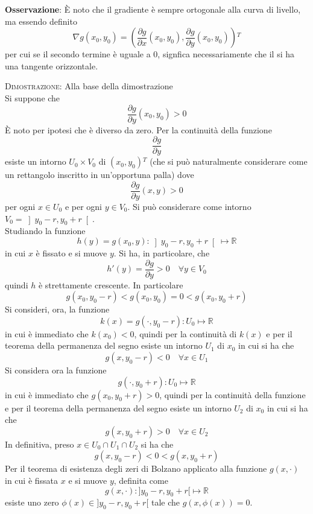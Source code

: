 \documentclass[a4paper]{extarticle}
\begin{document}
\vspace{2em}
\noindent
\textbf{Osservazione}: È noto che il gradiente è sempre ortogonale alla curva di livello, ma essendo definito
\[\nabla g(x_0,y_0) = \left(\dfrac{\partial g}{\partial x}(x_0,y_0), \dfrac{\partial g}{\partial y} (x_0,y_0)\right){^T}\]
per cui se il secondo termine è uguale a $0$, signfica necessariamente che il si ha una tangente orizzontale.

\vspace{2em}
\noindent
\normalfont \normalsize
\textsc{Dimostrazione}: Alla base della dimostrazione\\
Si suppone che
\[\dfrac{\partial g}{\partial y}(x_0,y_0) > 0\]
È noto per ipotesi che è diverso da zero. Per la continuità della funzione
\[\dfrac{\partial g}{\partial y}\]
esiste un intorno $U_0 \times V_0$ di $(x_0,y_0){^T}$ (che si può naturalmente considerare come un rettangolo inscritto in un'opportuna palla) dove
\[\dfrac{\partial g}{\partial y}(x,y) > 0\]
per ogni $x \in U_0$ e per ogni $y \in V_0$. Si può considerare come intorno $V_0 = \left]y_0-r,y_0+r\right[$.\\
Studiando la funzione
\[h(y) = g(x_0,y) : \left]y_0-r,y_0+r\right[ \longmapsto \mathbb{R}\]
in cui $x$ è fissato e si muove $y$. Si ha, in particolare, che
\[h'(y) = \dfrac{\partial g}{\partial y} > 0 \hspace{1em} \forall y \in V_0\]
quindi $h$ è strettamente crescente. In particolare
\[g(x_0,y_0-r) < g(x_0,y_0) = 0 < g(x_0,y_0+r)\]
Si consideri, ora, la funzione
\[k(x) = g(\cdot,y_0-r) : U_0 \longmapsto \mathbb{R}\]
in cui è immediato che $k(x_0) < 0$, quindi per la continuità di $k(x)$ e per il teorema della permanenza del segno esiste un intorno $U_1$ di $x_0$ in cui si ha che
\[g(x,y_{0}-r) < 0 \hspace{1em} \forall x \in U_1\]
Si considera ora la funzione 
\[g(\cdot,y_0+r) : U_0 \longmapsto \mathbb{R}\]
in cui è immediato che $g(x_0,y_0+r) > 0$, quindi per la continuità della funzione e per il teorema della permanenza del segno esiste un intorno $U_2$ di $x_0$ in cui si ha che
\[g(x,y_{0}+r) > 0 \hspace{1em} \forall x \in U_2\]
In definitiva, preso $x \in U_0 \cap U_1 \cap U_2$ si ha che
\[g(x,y_0-r) < 0 < g(x,y_0+r)\]
Per il teorema di esistenza degli zeri di Bolzano applicato alla funzione $g(x,\cdot)$ in cui è fissata $x$ e si muove $y$, definita come
\[g(x, \cdot) : ]y_0-r,y_0+r[ \longmapsto \mathbb{R}\]
esiste uno zero $\phi(x) \in ]y_0-r,y_0+r[$ tale che $g(x,\phi(x)) = 0$.\\
\end{document}
